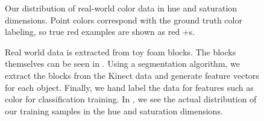 \documentclass[11pt]{article}
\begin{document}
\begin{figure}
\centering
\caption{Our distribution of real-world color data in hue and saturation
    dimensions. Point colors correspond with the ground truth color labeling,
    so true red examples are shown as red +s.}
\label{fig:colordata}
\end{figure}

\begin{figure}[h!]
\centering
{}
\caption{Real world data is extracted from toy foam blocks. The blocks
    themselves can be seen in . Using a segmentation
    algorithm, we extract the blocks from the Kinect data 
    and generate feature vectors for each object.
    Finally, we hand label the data for features such as color for
    classification training. In , we see the actual
    distribution of our training samples in the hue and saturation
    dimensions.}
\label{fig:objects}
\end{figure}
\end{document}
